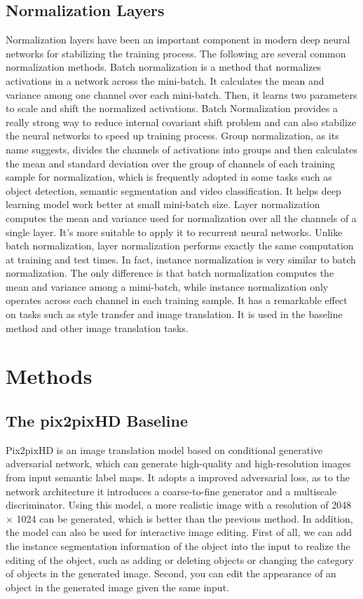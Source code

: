 \documentclass[10pt,twocolumn,letterpaper]{article}
\begin{document}
\subsection{Normalization Layers}
Normalization layers have been an important component in modern deep neural networks for stabilizing the training process. 
The following are several common normalization methods. 
Batch normalization\cite{bn} is a method that normalizes activations in a network across the mini-batch. 
It calculates the mean and variance among one channel over each mini-batch. Then, it learns two parameters to scale and shift the normalized activations.
Batch Normalization provides a really strong way to reduce internal covariant shift problem and can also stabilize the neural networks to speed up training process.
Group normalization\cite{gn}, as its name suggests, divides the channels of activations into groups and then calculates the mean and standard deviation over the group of channels of each training sample for normalization, which is frequently adopted in some tasks such as object detection, semantic segmentation and video classification. It helps deep learning model work better at small mini-batch size.
Layer normalization\cite{ln} computes the mean and variance used for normalization over all the channels of a single layer. It's more suitable to apply it to recurrent neural networks. Unlike batch normalization, layer normalization performs exactly the same computation at training and test times.
In fact, instance normalization\cite{instance_norm} is very similar to batch normalization. 
The only difference is that batch normalization computes the mean and variance among a mimi-batch, while instance normalization only operates across each channel in each training sample. 
It has a remarkable effect on tasks such as style transfer and image translation. It is used in the baseline method\cite{pix2pixhd} and other image translation tasks\cite{spade,cyclegan,bicyclegan,maskgan}. 

\section{Methods}

\subsection{The pix2pixHD Baseline}
Pix2pixHD\cite{pix2pixhd} is an image translation model based on conditional generative adversarial network, which can generate high-quality and high-resolution images from input semantic label maps. It adopts a improved adversarial loss, as to the network architecture it introduces a coarse-to-fine generator and a multiscale discriminator. Using this model, a more realistic image with a resolution of 2048 × 1024 can be generated, which is better than the previous method. In addition, the model can also be used for interactive image editing. First of all, we can add the instance segmentation information of the object into the input to realize the editing of the object, such as adding or deleting objects or changing the category of objects in the generated image. Second, you can edit the appearance of an object in the generated image given the same input. 
\end{document}
